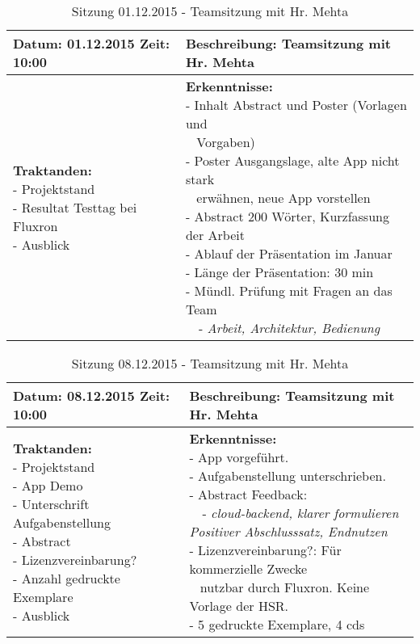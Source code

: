 \begin{table}[H]
\begin{tabularx}{\textwidth}{| l | X |}
\hline
\textbf{Datum:} 01.12.2015
\textbf{Zeit:} 10:00
&
\textbf{Beschreibung:} Teamsitzung mit Hr. Mehta \\ \hline
\specialcell[t]{
\textbf{Traktanden:}\\
- Projektstand\\
- Resultat Testtag bei Fluxron\\
- Ausblick\\
}
& 
\specialcell[t]{
\textbf{Erkenntnisse:}\\
- Inhalt Abstract und Poster (Vorlagen und\\~ Vorgaben)\\
- Poster Ausgangslage, alte App nicht stark\\~ erwähnen, neue App vorstellen\\
- Abstract 200 Wörter, Kurzfassung der Arbeit\\
- Ablauf der Präsentation im Januar\\
- Länge der Präsentation: 30 min\\
- Mündl. Prüfung mit Fragen an das Team\\
~~- \textit{Arbeit, Architektur, Bedienung}\\
}
\\ \hline
\end{tabularx}
\caption{Sitzung 01.12.2015 - Teamsitzung mit Hr. Mehta}
\end{table}



\begin{table}[H]
\begin{tabularx}{\textwidth}{| l | X |}
\hline
\textbf{Datum:} 08.12.2015
\textbf{Zeit:} 10:00
&
\textbf{Beschreibung:} Teamsitzung mit Hr. Mehta \\ \hline
\specialcell[t]{
\textbf{Traktanden:}\\
- Projektstand\\
- App Demo\\
- Unterschrift Aufgabenstellung\\
- Abstract\\
- Lizenzvereinbarung?\\
- Anzahl gedruckte Exemplare\\
- Ausblick\\
}
& 
\specialcell[t]{
\textbf{Erkenntnisse:}\\
- App vorgeführt.\\
- Aufgabenstellung unterschrieben.\\
- Abstract Feedback:\\
~~- \textit{cloud-backend, klarer formulieren}\\
\textit{Positiver Abschlusssatz, Endnutzen}\\
- Lizenzvereinbarung?: Für kommerzielle Zwecke\\~ nutzbar durch Fluxron. Keine Vorlage der HSR.\\
- 5 gedruckte Exemplare, 4 cds\\
}
\\ \hline
\end{tabularx}
\caption{Sitzung 08.12.2015 - Teamsitzung mit Hr. Mehta}
\end{table}